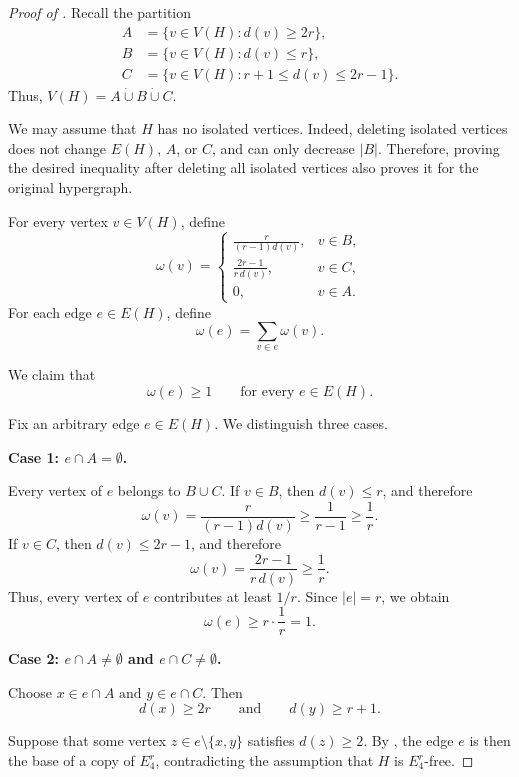 \documentclass[11pt,a4paper]{article}
\theoremstyle{definition}
\theoremstyle{remark}
\begin{document}
\begin{proof}[Proof of ]
Recall the partition
$$
\begin{aligned}
A&=\{v\in V(H):d(v)\geq2r\},\\
B&=\{v\in V(H):d(v)\leq r\},\\
C&=\{v\in V(H):r+1\leq d(v)\leq2r-1\}.
\end{aligned}
$$
Thus,
$
V(H)=A\mathbin{\dot\cup}B\mathbin{\dot\cup}C.
$

We may assume that \(H\) has no isolated vertices. Indeed, deleting
isolated vertices does not change \(E(H)\), \(A\), or \(C\), and can
only decrease \(|B|\). Therefore, proving the desired inequality after
deleting all isolated vertices also proves it for the original
hypergraph.

For every vertex \(v\in V(H)\), define
$$
\omega(v)=
\begin{cases}
\displaystyle
\frac{r}{(r-1)d(v)},&v\in B,\\[2ex]
\displaystyle
\frac{2r-1}{r\,d(v)},&v\in C,\\[2ex]
0,&v\in A.
\end{cases}
$$
For each edge \(e\in E(H)\), define
$$
\omega(e)=\sum_{v\in e}\omega(v).
$$

We claim that
$$
\omega(e)\geq1
\qquad
\text{for every }e\in E(H).
\label{eq:crown-edge-weight}
$$

Fix an arbitrary edge \(e\in E(H)\). We distinguish three cases.

\medskip
\noindent
\textbf{Case 1: \(e\cap A=\emptyset\).}

Every vertex of \(e\) belongs to \(B\cup C\). If \(v\in B\), then
\(d(v)\leq r\), and therefore
$$
\omega(v)
=
\frac{r}{(r-1)d(v)}
\geq
\frac{1}{r-1}
\geq
\frac1r.
$$
If \(v\in C\), then \(d(v)\leq2r-1\), and therefore
$$
\omega(v)
=
\frac{2r-1}{r\,d(v)}
\geq
\frac1r.
$$
Thus, every vertex of \(e\) contributes at least \(1/r\). Since
\(|e|=r\), we obtain
$$
\omega(e)\geq r\cdot\frac1r=1.
$$

\medskip
\noindent
\textbf{Case 2: \(e\cap A\neq\emptyset\) and
\(e\cap C\neq\emptyset\).}

Choose
$
x\in e\cap A \text{ and }
y\in e\cap C
$.
Then
$$
d(x)\geq2r
\qquad\text{and}\qquad
d(y)\geq r+1.
$$

Suppose that some vertex
$
z\in e\setminus\{x,y\}
$ satisfies \(d(z)\geq2\). By , the edge \(e\) is then the
base of a copy of \(E_4^r\), contradicting the assumption that \(H\)
is \(E_4^r\)-free.


\end{proof}
\end{document}
